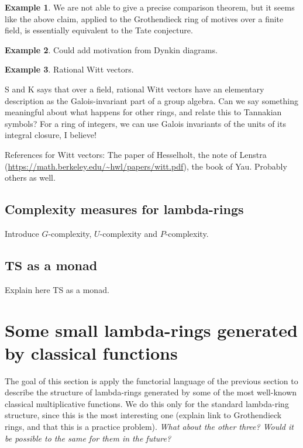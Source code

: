 \documentclass[a4paper]{article}
\theoremstyle{definition}
\newtheorem{example}{Example}[section]
\theoremstyle{remark}
\newcommand{\TS}{\mathbf{TS}}
\begin{document}
\begin{example}
We are not able to give a precise comparison theorem, but it seems like the above claim, applied to the Grothendieck ring of motives over a finite field, is essentially equivalent to the Tate conjecture.
\end{example}

\begin{example}
Could add motivation from Dynkin diagrams.
\end{example}

\begin{example}
Rational Witt vectors.
\end{example}

S and K says that over a field, rational Witt vectors have an elementary description as the Galois-invariant part of a group algebra. Can we say something meaningful about what happens for other rings, and relate this to Tannakian symbols? For a ring of integers, we can use Galois invariants of the units of its integral closure, I believe!

References for Witt vectors:
The paper of Hesselholt, the note of Lenstra (\url{https://math.berkeley.edu/~hwl/papers/witt.pdf}), the book of Yau. Probably others as well.

\subsection{Complexity measures for lambda-rings}

Introduce $G$-complexity, $U$-complexity and $P$-complexity.



\subsection{$\TS$ as a monad}

Explain here TS as a monad.

\section{Some small lambda-rings generated by classical functions}

The goal of this section is apply the functorial language of the previous section to describe the structure of lambda-rings generated by some of the most well-known classical multiplicative functions. We do this only for the standard lambda-ring structure, since this is the most interesting one (explain link to Grothendieck rings, and that this is a practice problem). \emph{What about the other three? Would it be possible to the same for them in the future?}
\end{document}
